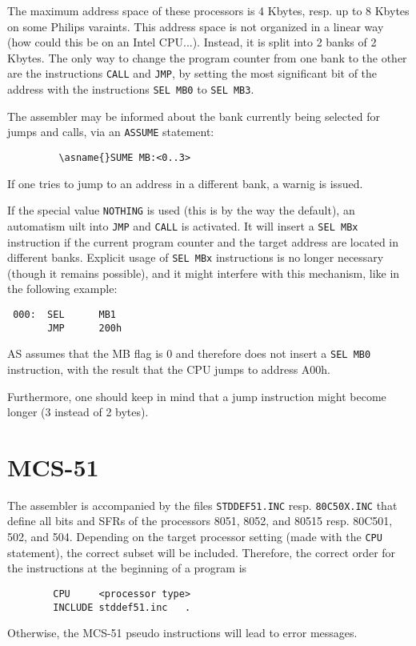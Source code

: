 \documentclass[12pt,twoside]{report}
\newcommand{\tty}[1]{{\tt #1}}
\newcommand{\asname}{{AS}}
\begin{document}
The maximum address space of these processors is 4 Kbytes, resp.  up to
8 Kbytes on some Philips varaints.  This address space is not organized
in a linear way (how could this be on an Intel CPU...).  Instead, it is
split into 2 banks of 2 Kbytes.  The only way to change the program
counter from one bank to the other are the instructions \tty{CALL} and
\tty{JMP}, by setting the most significant bit of the address with the
instructions \tty{SEL MB0} to \tty{SEL MB3}.

The assembler may be informed about the bank currently being selected for
jumps and calls, via an {\tt \asname{}SUME} statement:
\begin{verbatim}
         \asname{}SUME MB:<0..3>
\end{verbatim}
If one tries to jump to an address in a different bank, a warnig is
issued.

If the special value {\tt NOTHING} is used (this is by the way the
default), an automatism uilt into \tty{JMP} and \tty{CALL} is activated.
It will insert a {\tt SEL MBx} instruction if the current program counter
and the target address are located in different banks.  Explicit usage of
\tty{SEL MBx} instructions is no longer necessary (though it remains possible),
and it might interfere with this mechanism, like in the following example:
\begin{verbatim}
 000:  SEL      MB1
       JMP      200h
\end{verbatim}
\asname{} assumes that the MB flag is 0 and therefore does not insert a \tty{SEL
MB0} instruction, with the result that the CPU jumps to address
A00h.

Furthermore, one should keep in mind that a jump instruction might
become longer (3 instead of 2 bytes).


\section{MCS-51}

The assembler is accompanied by the files \tty{STDDEF51.INC} resp.
\tty{80C50X.INC} that define all bits and SFRs of the processors 8051,
8052, and 80515 resp. 80C501, 502, and 504.  Depending on the target
processor setting (made with the \tty{CPU} statement), the correct subset
will be included.  Therefore, the correct order for the instructions
at the beginning of a program is
\begin{verbatim}
        CPU     <processor type>
        INCLUDE stddef51.inc   .
\end{verbatim}
Otherwise, the MCS-51 pseudo instructions will lead to error
messages.
\end{document}
